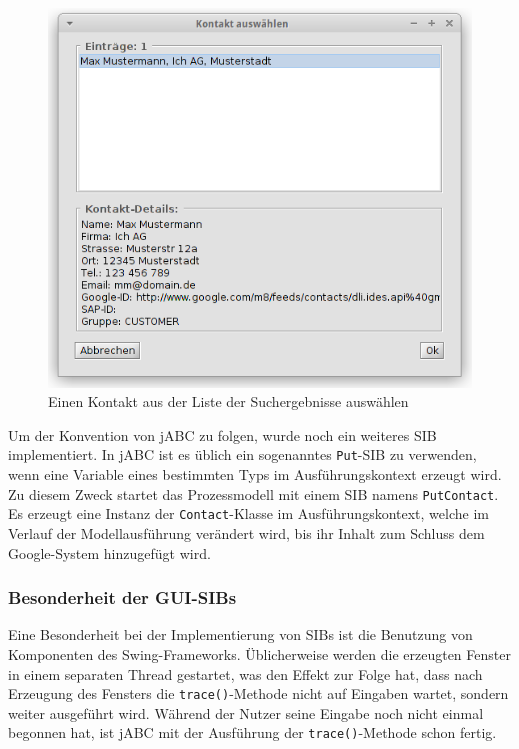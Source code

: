 \begin{figure}[h!t]
  \includegraphics[width=\textwidth]{Bilder/Sib_ChooseContact_Frame.png}
  \caption{Einen Kontakt aus der Liste der Suchergebnisse auswählen}
  \label{fig:sibchoose}
\end{figure}

Um der Konvention von jABC zu folgen, wurde noch ein weiteres SIB implementiert.
In jABC ist es üblich ein sogenanntes \lstinline{Put}-SIB zu verwenden, wenn eine Variable eines bestimmten Typs im
 Ausführungskontext erzeugt wird.
Zu diesem Zweck startet das Prozessmodell mit einem SIB namens \lstinline{PutContact}.
Es erzeugt eine Instanz der \lstinline{Contact}-Klasse im Ausführungskontext, welche im Verlauf der Modellausführung
 verändert wird, bis ihr Inhalt zum Schluss dem Google-System hinzugefügt wird.
	
\FloatBarrier
\subsubsection{Besonderheit der GUI-SIBs}
Eine Besonderheit bei der Implementierung von SIBs ist die Benutzung von Komponenten des Swing-Frameworks.
Üblicherweise werden die erzeugten Fenster in einem separaten Thread gestartet, was den Effekt zur Folge hat, dass nach
 Erzeugung des Fensters die \lstinline{trace()}-Methode nicht auf Eingaben wartet, sondern weiter ausgeführt wird.
Während der Nutzer seine Eingabe noch nicht einmal begonnen hat, ist jABC mit der Ausführung der \lstinline{trace()}-Methode
 schon fertig.

